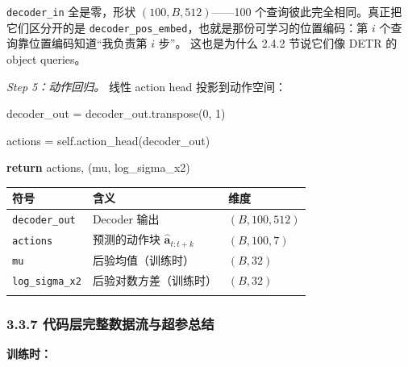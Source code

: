 \documentclass[
  chinese,
]{ctexart}
\newenvironment{Shaded}{\begin{snugshade}}{\end{snugshade}}
\newcommand{\ControlFlowTok}[1]{\textcolor[rgb]{0.00,0.23,0.31}{\textbf{#1}}}
\newcommand{\DecValTok}[1]{\textcolor[rgb]{0.68,0.00,0.00}{#1}}
\newcommand{\NormalTok}[1]{\textcolor[rgb]{0.00,0.23,0.31}{#1}}
\newcommand{\OperatorTok}[1]{\textcolor[rgb]{0.37,0.37,0.37}{#1}}
\newcommand{\VariableTok}[1]{\textcolor[rgb]{0.07,0.07,0.07}{#1}}
\begin{document}
\texttt{decoder\_in} 全是零，形状 \((100, B, 512)\)------100
个查询彼此完全相同。真正把它们区分开的是
\texttt{decoder\_pos\_embed}，也就是那份可学习的位置编码：第 \(i\)
个查询靠位置编码知道``我负责第 \(i\) 步''。 这也是为什么 2.4.2
节说它们像 DETR 的 object queries。

\emph{Step 5：动作回归。} 线性 action head 投影到动作空间：

\begin{Shaded}
\begin{Highlighting}[]
\NormalTok{        decoder\_out }\OperatorTok{=}\NormalTok{ decoder\_out.transpose(}\DecValTok{0}\NormalTok{, }\DecValTok{1}\NormalTok{)}

\NormalTok{        actions }\OperatorTok{=} \VariableTok{self}\NormalTok{.action\_head(decoder\_out)}

        \ControlFlowTok{return}\NormalTok{ actions, (mu, log\_sigma\_x2)}
\end{Highlighting}
\end{Shaded}

\begin{center}
\begin{tabular}{@{}>{\raggedright\arraybackslash}p{} >{\raggedright\arraybackslash}p{} >{\raggedright\arraybackslash}p{}@{}}
\toprule\noalign{}
符号 & 含义 & 维度 \\
\midrule\noalign{}
\texttt{decoder\_\allowbreak out} & Decoder 输出 & \((B, 100, 512)\) \\
\texttt{actions} & 预测的动作块 \(\hat{\mathbf{a}}_{t:t+k}\) & \((B, 100, 7)\) \\
\texttt{mu} & 后验均值（训练时） & \((B, 32)\) \\
\texttt{log\_\allowbreak sigma\_\allowbreak x2} & 后验对数方差（训练时） & \((B, 32)\) \\
\bottomrule\noalign{}
\end{tabular}
\end{center}

\subsubsection{3.3.7
代码层完整数据流与超参总结}\label{ux4ee3ux7801ux5c42ux5b8cux6574ux6570ux636eux6d41ux4e0eux8d85ux53c2ux603bux7ed3}

\textbf{训练时：}
\end{document}
